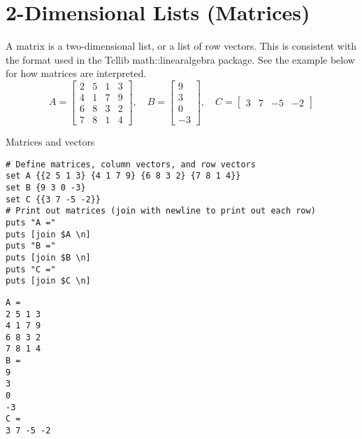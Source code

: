 \section{2-Dimensional Lists (Matrices)}
A matrix is a two-dimensional list, or a list of row vectors.
This is consistent with the format used in the Tcllib math::linearalgebra package.
See the example below for how matrices are interpreted.
\begin{equation*}\label{eq:matrix_AB}
A=\begin{bmatrix}
2 & 5 & 1 & 3 \\
4 & 1 & 7 & 9 \\
6 & 8 & 3 & 2 \\
7 & 8 & 1 & 4
\end{bmatrix},\quad
B=\begin{bmatrix}
9 \\ 3 \\ 0 \\ -3
\end{bmatrix},\quad
C = \begin{bmatrix}
3 & 7 & -5 & -2
\end{bmatrix}
\end{equation*}
\begin{example}{Matrices and vectors}
\begin{lstlisting}
# Define matrices, column vectors, and row vectors
set A {{2 5 1 3} {4 1 7 9} {6 8 3 2} {7 8 1 4}}
set B {9 3 0 -3}
set C {{3 7 -5 -2}}
# Print out matrices (join with newline to print out each row)
puts "A ="
puts [join $A \n]
puts "B ="
puts [join $B \n]
puts "C ="
puts [join $C \n]
\end{lstlisting}
\tcblower
\begin{lstlisting}
A =
2 5 1 3
4 1 7 9
6 8 3 2
7 8 1 4
B =
9
3
0
-3
C =
3 7 -5 -2
\end{lstlisting}
\end{example}
\clearpage
